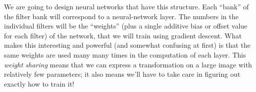 
We are going to design neural networks that have this structure.  Each
``bank'' of the filter bank will correspond to a neural-network
layer.  The numbers in the individual filters will be the ``weights''
(plus a single additive bias or offset value for each filter)
of the network, that we will train using gradient descent.  What
makes this interesting and powerful (and somewhat confusing at first)
is that the same weights are used many many times in the computation
of each layer.  This {\em weight sharing} means that we can express a
transformation on a large image with relatively few parameters; it
also means we'll have to take care in figuring out exactly how to
train it!

